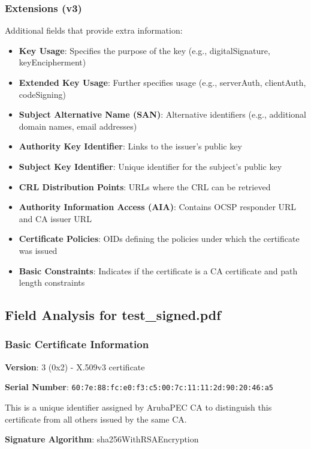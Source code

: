 \documentclass[12pt,a4paper]{article}
\begin{document}
\subsubsection{Extensions (v3)}
Additional fields that provide extra information:
\begin{itemize}
    \item \textbf{Key Usage}: Specifies the purpose of the key (e.g., digitalSignature, keyEncipherment)
    \item \textbf{Extended Key Usage}: Further specifies usage (e.g., serverAuth, clientAuth, codeSigning)
    \item \textbf{Subject Alternative Name (SAN)}: Alternative identifiers (e.g., additional domain names, email addresses)
    \item \textbf{Authority Key Identifier}: Links to the issuer's public key
    \item \textbf{Subject Key Identifier}: Unique identifier for the subject's public key
    \item \textbf{CRL Distribution Points}: URLs where the CRL can be retrieved
    \item \textbf{Authority Information Access (AIA)}: Contains OCSP responder URL and CA issuer URL
    \item \textbf{Certificate Policies}: OIDs defining the policies under which the certificate was issued
    \item \textbf{Basic Constraints}: Indicates if the certificate is a CA certificate and path length constraints
\end{itemize}

\subsection{Field Analysis for test\_signed.pdf}

\subsubsection{Basic Certificate Information}

\textbf{Version}: 3 (0x2) - X.509v3 certificate

\textbf{Serial Number}: \texttt{60:7e:88:fc:e0:f3:c5:00:\allowbreak 7c:11:11:2d:90:20:46:a5}

This is a unique identifier assigned by ArubaPEC CA to distinguish this certificate from all others issued by the same CA.

\textbf{Signature Algorithm}: sha256WithRSAEncryption
\end{document}
